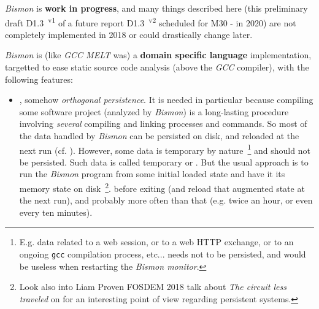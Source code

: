 \textit{Bismon} is \textbf{work in progress}, and many things
described here (this preliminary draft D1.3~\textsuperscript{v1} of a
future report D1.3~\textsuperscript{v2} scheduled for M30 - in 2020)
are not completely implemented in 2018 or could drastically change
later.

\bigskip

\textit{Bismon} is (like \textit{GCC MELT} was) a \textbf{domain
  specific language} implementation, targetted to ease static source
code analysis (above the \textit{GCC} compiler), with the following
features:

\begin{itemize}

  \item {}, somehow
    \textit{orthogonal persistence}. It is needed in particular
    because compiling some software project (analyzed by
    \textit{Bismon}) is a long-lasting procedure involving
    \textit{several} compiling and linking processes and commands. So
    most of the data handled by \textit{Bismon} can be persisted on
    disk, and reloaded at the next run
    (cf. \cite{Dearle-2010-orthopersist,
      Dearle:2009:OrthogonalPR}). However, some data is temporary by
    nature~\footnote{E.g. data related to a web session, or to a web
      HTTP exchange, or to an ongoing \texttt{gcc} compilation
      process, etc... needs not to be persisted, and would be useless
      when restarting the \textit{Bismon monitor}.} and should not be
    persisted. Such data is called temporary or
    . But the usual approach is
    to run the \textit{Bismon} program from some initial loaded state
    and have it  its memory state on
    disk~\footnote{Look also into Liam Proven FOSDEM 2018 talk about
      \emph{The circuit less traveled} on
      for an interesting point of view regarding persistent systems.}.
    before exiting (and reload that augmented state at the next run),
    and probably more often than that (e.g. twice an hour, or even
    every ten minutes).


\end{itemize}
